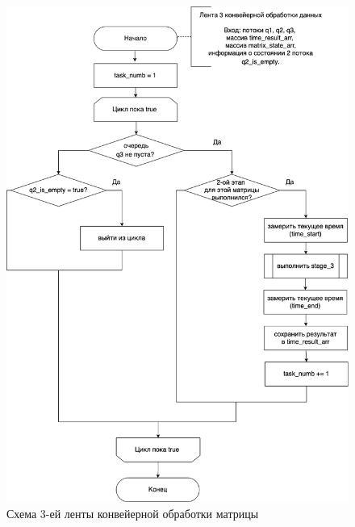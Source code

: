 \begin{figure}[h]
	\centering
	\includegraphics[scale=0.5]{img/parallel_stage_3.png}
	\caption{Схема 3-ей ленты конвейерной обработки матрицы}
	\label{fig:parallel_stage_3}
\end{figure} 

\clearpage

